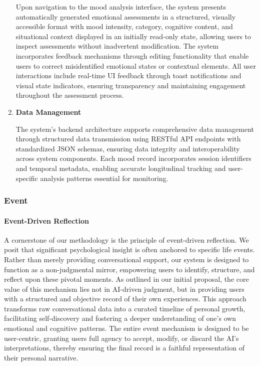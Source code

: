 \begin{enumerate}
Upon navigation to the mood analysis interface, the system presents automatically generated emotional assessments in a structured, visually accessible format with mood intensity, category, cognitive content, and situational context displayed in an initially read-only state, allowing users to inspect assessments without inadvertent modification. The system incorporates feedback mechanisms through editing functionality that enable users to correct misidentified emotional states or contextual elements. All user interactions include real-time UI feedback through toast notifications and visual state indicators, ensuring transparency and maintaining engagement throughout the assessment process.

\item \textbf{Data Management}

The system's backend architecture supports comprehensive data management through structured data transmission using RESTful API endpoints with standardized JSON schemas, ensuring data integrity and interoperability across system components. Each mood record incorporates session identifiers and temporal metadata, enabling accurate longitudinal tracking and user-specific analysis patterns essential for monitoring.

\end{enumerate}


\subsubsection{Event}

\paragraph{Event-Driven Reflection}
A cornerstone of our methodology is the principle of event-driven reflection. We posit that significant psychological insight is often anchored to specific life events. Rather than merely providing conversational support, our system is designed to function as a non-judgmental mirror, empowering users to identify, structure, and reflect upon these pivotal moments. As outlined in our initial proposal, the core value of this mechanism lies not in AI-driven judgment, but in providing users with a structured and objective record of their own experiences. This approach transforms raw conversational data into a curated timeline of personal growth, facilitating self-discovery and fostering a deeper understanding of one's own emotional and cognitive patterns. The entire event mechanism is designed to be user-centric, granting users full agency to accept, modify, or discard the AI's interpretations, thereby ensuring the final record is a faithful representation of their personal narrative.

